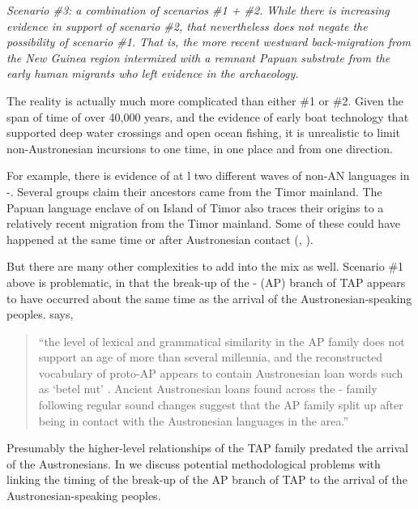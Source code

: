 \it{Scenario {\#}3:} a combination of scenarios {\#}1 + {\#}2.
While there is increasing evidence in support of scenario {\#}2,
that nevertheless does not negate the possibility of scenario {\#}1.
That is, the more recent westward back-migration from the New Guinea region intermixed with a remnant
Papuan substrate from the early human migrants who left evidence in the archaeology.

The reality is actually much more complicated than either {\#}1 or {\#}2.
Given the span of time of over 40,000 years,
and the evidence of early boat technology that supported deep water crossings
and open ocean fishing,
it is unrealistic to limit non-Austronesian incursions to one time,
in one place and from one direction.

For example, there is evidence of at l two different waves of non-AN languages in -.
Several groups claim their ancestors came from the Timor mainland.
The Papuan language enclave of  on  Island  of Timor also traces their origins to a relatively
recent migration from the Timor mainland.
Some of these could have happened at the
same time or after Austronesian contact
(\citealp[8f]{GrimesTherikGrimesJacob1997}, \citealp{Klamer2017}).

But there are many other complexities to add into the mix as well.
Scenario {\#}1 above is problematic,
in that the break-up of the - (AP) branch of TAP appears to have occurred about the same time
as the arrival of the Austronesian-speaking peoples.
\citet[10]{Klamer2017} says,

\begin{quote}
“the level of lexical
and grammatical similarity in the AP family does not support
an age of more than several millennia,
and the reconstructed vocabulary of proto-AP appears
to contain Austronesian loan words such as ‘betel
nut’ \citep{HoltonSchapper2012,Robinson2015}.
Ancient Austronesian loans found across the - family
following regular sound changes suggest
that the AP family split up after being in contact
with the Austronesian languages in the area.”
\end{quote}

Presumably
the higher-level relationships of the TAP
family predated the arrival of the Austronesians.
In  we discuss potential methodological
problems with linking the timing of the break-up
of the AP branch of TAP to the arrival
of the Austronesian-speaking peoples.

